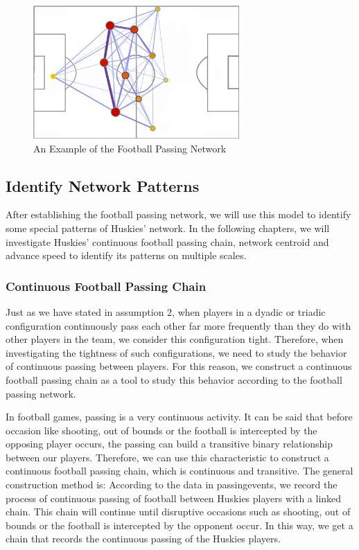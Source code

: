 \documentclass{mcmthesis}
\begin{document}
	\begin{figure}[h]
		\centering
		\includegraphics[width=0.7\textwidth]{figures/playground.png}
		\caption{An Example of the Football Passing Network}
		\label{fig:playground}
	\end{figure}
\subsection{Identify Network Patterns}
	After establishing the football passing network, we will use this model to identify some special patterns of Huskies' network.  In the following chapters, we will investigate Huskies' continuous football passing chain, network centroid and advance speed to identify its patterns on multiple scales. 
\subsubsection{Continuous Football Passing Chain}
	Just as we have stated in assumption 2, when players in a dyadic or triadic configuration continuously pass each other far more frequently than they do with other players in the team, we consider this configuration tight.  Therefore, when investigating the tightness of such configurations, we need to study the behavior of continuous passing between players.  For this reason, we construct a continuous football passing chain as a tool to study this behavior according to the football passing network.

	In football games, passing is a very continuous activity.  It can be said that before occasion like shooting, out of bounds or the football is intercepted by the opposing player occurs, the passing can build a transitive binary relationship between our players.  Therefore, we can use this characteristic to construct a continuous football passing chain, which is continuous and transitive.  The general construction method is: According to the data in passingevents, we record the process of continuous passing of football between Huskies players with a linked chain.  This chain will continue until disruptive occasions such as shooting, out of bounds or the football is intercepted by the opponent occur.  In this way, we get a chain that records the continuous passing of the Huskies players.
\end{document}
